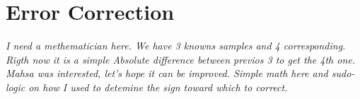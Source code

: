 \section{Error Correction} \label{sec:error}
\textit{I need a methematician here. We have 3 knowns samples and 4 corresponding. Rigth now it is a simple Absolute difference between previos 3 to get the 4th one. Mahsa was interested, let's hope it can be improved. Simple math here and sudo-logic on how I used to detemine the sign toward which to correct.}